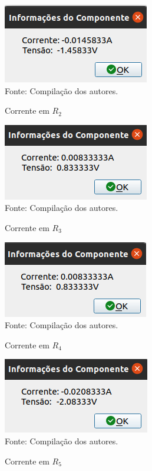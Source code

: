 \documentclass[twocolumn, 10pt,a4paper]{extarticle}
\begin{document}
\begin{figure}[H]
	\caption{Corrente em $R_2$} 
	\centering
	\includegraphics[scale=0.7]{ir2}
	\\ Fonte: Compilação dos autores.
\end{figure}

\begin{figure}[H]
	\caption{Corrente em $R_3$} 
	\centering
	\includegraphics[scale=0.7]{ir3}
	\\ Fonte: Compilação dos autores.
\end{figure}

\begin{figure}[H]
	\caption{Corrente em $R_4$} 
	\centering
	\includegraphics[scale=0.7]{ir4}
	\\ Fonte: Compilação dos autores.
\end{figure}

\begin{figure}[H]
	\caption{Corrente em $R_5$} 
	\centering
	\includegraphics[scale=0.7]{ir5}
	\\ Fonte: Compilação dos autores.
\end{figure}
\end{document}
